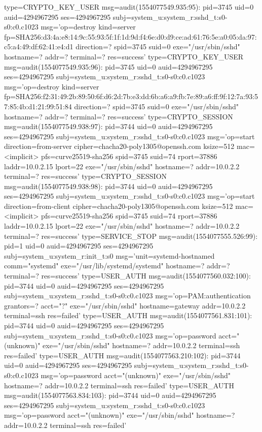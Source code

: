 \documentclass[]{report}
\newenvironment{Shaded}{}{}
\newcommand{\NormalTok}[1]{#1}
\begin{document}
\begin{Shaded}
\begin{Highlighting}[]
\NormalTok{type=CRYPTO_KEY_USER msg=audit(1554077549.935:95): pid=3745 uid=0 auid=4294967295 ses=4294967295 subj=system_u:system_r:sshd_t:s0-s0:c0.c1023 msg='op=destroy kind=server fp=SHA256:d3:4a:e8:14:9c:55:93:5f:1f:1d:9d:f4:6e:d0:d9:ce:ad:61:76:5e:a0:05:da:97:c5:a4:49:df:62:41:e4:d1 direction=? spid=3745 suid=0  exe="/usr/sbin/sshd" hostname=? addr=? terminal=? res=success'}
\NormalTok{type=CRYPTO_KEY_USER msg=audit(1554077549.935:96): pid=3745 uid=0 auid=4294967295 ses=4294967295 subj=system_u:system_r:sshd_t:s0-s0:c0.c1023 msg='op=destroy kind=server fp=SHA256:f2:31:49:2b:89:50:6f:d6:2d:7b:e3:dd:6b:a6:a9:fb:7e:89:a6:ff:9f:12:7a:93:57:85:4b:d1:21:99:51:84 direction=? spid=3745 suid=0  exe="/usr/sbin/sshd" hostname=? addr=? terminal=? res=success'}
\NormalTok{type=CRYPTO_SESSION msg=audit(1554077549.938:97): pid=3744 uid=0 auid=4294967295 ses=4294967295 subj=system_u:system_r:sshd_t:s0-s0:c0.c1023 msg='op=start direction=from-server cipher=chacha20-poly1305@openssh.com ksize=512 mac=<implicit> pfs=curve25519-sha256 spid=3745 suid=74 rport=37886 laddr=10.0.2.15 lport=22  exe="/usr/sbin/sshd" hostname=? addr=10.0.2.2 terminal=? res=success'}
\NormalTok{type=CRYPTO_SESSION msg=audit(1554077549.938:98): pid=3744 uid=0 auid=4294967295 ses=4294967295 subj=system_u:system_r:sshd_t:s0-s0:c0.c1023 msg='op=start direction=from-client cipher=chacha20-poly1305@openssh.com ksize=512 mac=<implicit> pfs=curve25519-sha256 spid=3745 suid=74 rport=37886 laddr=10.0.2.15 lport=22  exe="/usr/sbin/sshd" hostname=? addr=10.0.2.2 terminal=? res=success'}
\NormalTok{type=SERVICE_STOP msg=audit(1554077555.526:99): pid=1 uid=0 auid=4294967295 ses=4294967295 subj=system_u:system_r:init_t:s0 msg='unit=systemd-hostnamed comm="systemd" exe="/usr/lib/systemd/systemd" hostname=? addr=? terminal=? res=success'}
\NormalTok{type=USER_AUTH msg=audit(1554077560.032:100): pid=3744 uid=0 auid=4294967295 ses=4294967295 subj=system_u:system_r:sshd_t:s0-s0:c0.c1023 msg='op=PAM:authentication grantors=? acct="?" exe="/usr/sbin/sshd" hostname=gateway addr=10.0.2.2 terminal=ssh res=failed'}
\NormalTok{type=USER_AUTH msg=audit(1554077561.831:101): pid=3744 uid=0 auid=4294967295 ses=4294967295 subj=system_u:system_r:sshd_t:s0-s0:c0.c1023 msg='op=password acct="(unknown)" exe="/usr/sbin/sshd" hostname=? addr=10.0.2.2 terminal=ssh res=failed'}
\NormalTok{type=USER_AUTH msg=audit(1554077563.210:102): pid=3744 uid=0 auid=4294967295 ses=4294967295 subj=system_u:system_r:sshd_t:s0-s0:c0.c1023 msg='op=password acct="(unknown)" exe="/usr/sbin/sshd" hostname=? addr=10.0.2.2 terminal=ssh res=failed'}
\NormalTok{type=USER_AUTH msg=audit(1554077563.834:103): pid=3744 uid=0 auid=4294967295 ses=4294967295 subj=system_u:system_r:sshd_t:s0-s0:c0.c1023 msg='op=password acct="(unknown)" exe="/usr/sbin/sshd" hostname=? addr=10.0.2.2 terminal=ssh res=failed'}

\end{Highlighting}
\end{Shaded}
\end{document}
